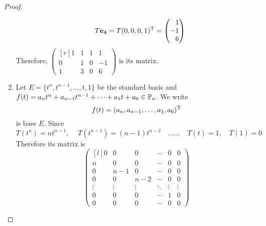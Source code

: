 \documentclass{article}
\begin{document}
\begin{proof}
\begin{enumerate}
\begin{align*}
        &&T\vec{e_4}=T(0,0,0,1)\tran= \begin{pmatrix*}[r] 1\\-1\\6 \end{pmatrix*}
      \end{align*}
      Therefore, 
      $ \begin{pmatrix*}[r]
        1&1&1&1\\
        0&1&0&-1\\
        1&3&0&6
      \end{pmatrix*} $
      is its matrix.
    \item Let $E=\{t^n,t^{n-1},\dots,t,1\}$ be the standard basis
      and $f(t)=a_nt^n+a_{n-1}t^{n-1}+\cdots+a_1t+a_0\in\P_n$. We write
      \[
        f(t)=(a_n, a_{n-1},\dots,a_1,a_0)^\mathrm{T}
      \]
      is base $E$. Since
      \[
        T(t^n)=nt^{n-1},\quad~T(t^{n-1})=(n-1)t^{n-2}\quad,\dots,\quad T(t)=1,\quad T(1)=0
      \]
      Therefore its matrix is 
      \[
        \begin{pmatrix*}[l]
          0&0&0&\cdots&0&0\\
          n&0&0&\cdots&0&0\\
          0&n-1&0&\cdots&0&0\\
          0&0&n-2&\cdots&0&0\\
          \vdots & \vdots & \vdots & \ddots &\vdots & \vdots\\
          0&0&0&\cdots&1&0\\
          0&0&0&\cdots&0&0
        \end{pmatrix*}
      \]

\end{enumerate}
\end{proof}
\end{document}
